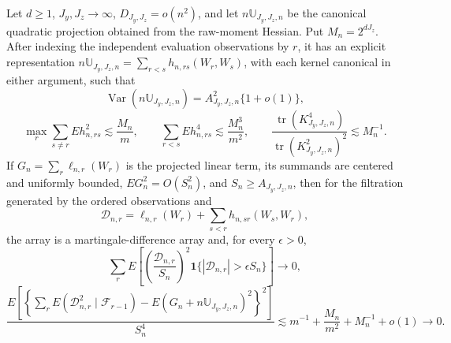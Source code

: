 Let \(d\ge1\), \(J_y,J_z\to\infty\), \(D_{J_y,J_z}=o(n^2)\), and let \(n\mathbb U_{J_y,J_z,n}\) be the canonical quadratic projection obtained from the raw-moment Hessian. Put \(M_n=2^{dJ_z}\). After indexing the independent evaluation observations by \(r\), it has an explicit representation \(n\mathbb U_{J_y,J_z,n}=\sum_{r<s}h_{n,rs}(W_r,W_s)\), with each kernel canonical in either argument, such that
\[
\operatorname{Var}(n\mathbb U_{J_y,J_z,n})=A_{J_y,J_z,n}^2\{1+o(1)\},
\]
\[
\max_r\sum_{s\ne r}E h_{n,rs}^2\lesssim \frac{M_n}{m},
\qquad
\sum_{r<s}E h_{n,rs}^4\lesssim\frac{M_n^3}{m^2},
\qquad
\frac{\operatorname{tr}(K_{J_y,J_z,n}^4)}{\operatorname{tr}(K_{J_y,J_z,n}^2)^2}\lesssim M_n^{-1}.
\]
If \(G_n=\sum_r\ell_{n,r}(W_r)\) is the projected linear term, its summands are centered and uniformly bounded, \(E G_n^2=O(S_n^2)\), and \(S_n\ge A_{J_y,J_z,n}\), then for the filtration generated by the ordered observations and
\[
\mathcal D_{n,r}=\ell_{n,r}(W_r)+\sum_{s<r}h_{n,sr}(W_s,W_r),
\]
the array is a martingale-difference array and, for every \(\epsilon>0\),
\[
\sum_rE\left[\left(\frac{\mathcal D_{n,r}}{S_n}\right)^2
\mathbf 1\{|\mathcal D_{n,r}|>\epsilon S_n\}\right]\to0,
\]
\[
\frac{E\left[\left\{\sum_rE(\mathcal D_{n,r}^2\mid\mathcal F_{r-1})-E(G_n+n\mathbb U_{J_y,J_z,n})^2\right\}^2\right]}{S_n^4}
\lesssim m^{-1}+\frac{M_n}{m^2}+M_n^{-1}+o(1)\to0.
\]